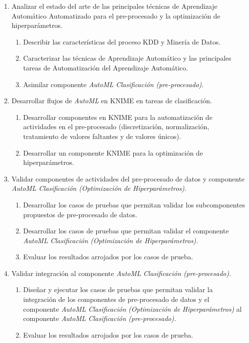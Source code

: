 \begin{enumerate}
	\item Analizar el estado del arte de las principales técnicas de Aprendizaje Automático Automatizado para el pre-procesado y la optimización de hiperparámetros.
	\begin{enumerate}
		\item Describir las características del proceso KDD y Minería de Datos. 
		\item Caracterizar las técnicas de Aprendizaje Automático y las principales tareas de Automatización del Aprendizaje Automático.
		\item Asimilar componente \textit{AutoML Clasificación (pre-procesado)}.
	\end{enumerate}
	\item Desarrollar flujos de \textit{AutoML} en KNIME en tareas de clasificación.
	\begin{enumerate}
		\item Desarrollar componentes en KNIME para la automatización de actividades en el pre-procesado (discretización, normalización, tratamiento de valores faltantes y de valores únicos).
		\item Desarrollar un componente KNIME para la optimización de hiperparámetros.
	\end{enumerate}
	\item Validar componentes de actividades del pre-procesado de datos y componente \textit{AutoML Clasificación (Optimización de Hiperparámetros)}.
	\begin{enumerate}
		\item Desarrollar los casos de pruebas que permitan validar los subcomponentes propuestos de pre-procesado de datos. 
		\item Desarrollar los casos de pruebas que permitan validar el componente \textit{AutoML Clasificación (Optimización de Hiperparámetros).}
		\item Evaluar los resultados arrojados por los casos de prueba.
	\end{enumerate} 
	\item Validar integración al componente \textit{AutoML Clasificación (pre-procesado).}
	\begin{enumerate}
		\item Diseñar y ejecutar los casos de pruebas que permitan validar la integración de los componentes de pre-procesado de datos y el componente\textit{ AutoML Clasificación (Optimización de Hiperparámetros)} al componente\textit{ AutoML Clasificación (pre-procesado).}
		\item Evaluar los resultados arrojados por los casos de prueba.
	\end{enumerate}
\end{enumerate}

